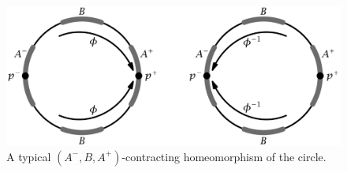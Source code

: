 \begin{figure}[ht]
 \includegraphics{PDF/Acontracting.jpg}
 \caption{A typical $(A^-,B,A^+)$-contracting
homeomorphism of the circle.} \label{Acontracting}
 \end{figure}
%
%
%
%
%
%
%
%
%
%
%
%

